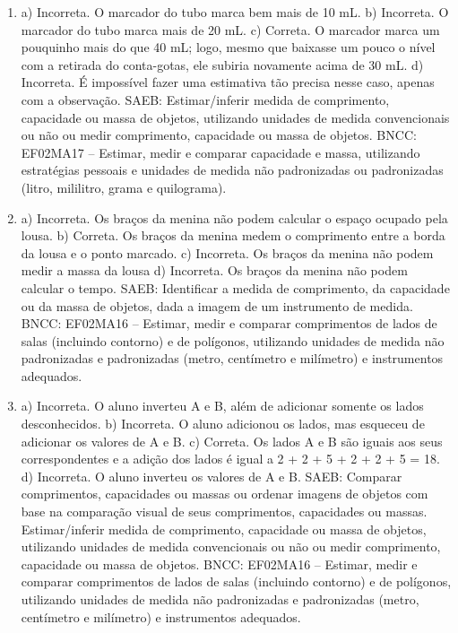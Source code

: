 \begin{enumerate}

\item
a) Incorreta. O marcador do tubo marca bem mais de 10 mL.
b) Incorreta. O marcador do tubo marca mais de 20 mL.
c) Correta. O marcador marca um pouquinho mais do que 40 mL; logo, mesmo que baixasse um pouco o nível com a retirada do conta-gotas, ele subiria novamente acima de 30 mL.
d) Incorreta. É impossível fazer uma estimativa tão precisa nesse caso, apenas com a observação.
SAEB: Estimar/inferir medida de comprimento, capacidade ou
massa de objetos, utilizando unidades de medida convencionais ou não ou
medir comprimento, capacidade ou massa de objetos.
BNCC: EF02MA17 -- Estimar, medir e comparar capacidade e massa,
utilizando estratégias pessoais e unidades de medida não padronizadas ou padronizadas (litro, mililitro,
grama e quilograma).

\item
a) Incorreta. Os braços da menina não podem calcular o espaço ocupado pela lousa.
b) Correta. Os braços da menina medem o comprimento entre a borda da lousa e o ponto marcado.
c) Incorreta. Os braços da menina não podem medir a massa da lousa
d) Incorreta. Os braços da menina não podem calcular o tempo.
SAEB: Identificar a medida de comprimento, da capacidade ou da
massa de objetos, dada a imagem de um instrumento de medida.
BNCC: EF02MA16 -- Estimar, medir e comparar comprimentos de lados de
salas (incluindo contorno) e de polígonos, utilizando unidades de medida não padronizadas e
padronizadas (metro, centímetro e milímetro) e instrumentos adequados.

\item
a) Incorreta. O aluno inverteu A e B, além de adicionar somente os lados desconhecidos.
b) Incorreta. O aluno adicionou os lados, mas esqueceu de adicionar os valores de A e B.
c) Correta. Os lados A e B são iguais aos seus correspondentes e a adição dos lados é igual a 2 + 2 + 5 + 2 + 2 + 5 = 18.
d) Incorreta. O aluno inverteu os valores de A e B.
SAEB: Comparar comprimentos, capacidades ou massas ou ordenar
imagens de objetos com base na comparação visual de seus comprimentos,
capacidades ou massas.
Estimar/inferir medida de comprimento, capacidade ou massa de
objetos, utilizando unidades de medida convencionais ou não ou medir
comprimento, capacidade ou massa de objetos.
BNCC: EF02MA16 -- Estimar, medir e comparar comprimentos de lados de
salas (incluindo contorno) e de polígonos, utilizando unidades de medida não padronizadas e
padronizadas (metro, centímetro e milímetro) e instrumentos adequados.
\end{enumerate}

